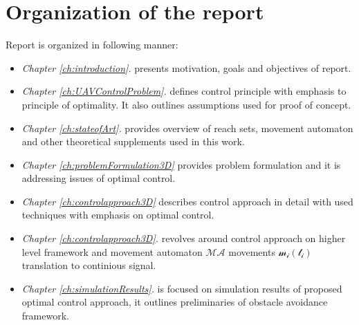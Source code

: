 \section{Organization of the report}\noindent
Report is organized in following manner:
\begin{itemize}
    \item\textit{Chapter \ref{ch:introduction}.} presents motivation, goals and objectives of report.
    \item\textit{Chapter \ref{ch:UAVControlProblem}.} defines control principle with emphasis to principle of optimality. It also outlines assumptions used for proof of concept.
    \item\textit{Chapter \ref{ch:stateofArt}.} provides overview of reach sets, movement automaton and other theoretical supplements used in this work.
    \item\textit{Chapter \ref{ch:problemFormulation3D}} provides problem formulation and it is addressing issues of optimal control.
    \item\textit{Chapter \ref{ch:controlapproach3D}} describes control approach in detail with used techniques with emphasis on optimal control.
    \item\textit{Chapter \ref{ch:controlapproach3D}.} revolves around control approach on higher level framework and movement automaton $\mathscr{MA}$ movements $\mathscr{m_i(t_i)}$ translation to continious signal.
    \item\textit{Chapter \ref{ch:simulationResults}.} is focused on simulation results of proposed optimal control approach, it outlines preliminaries of obstacle avoidance framework.
\end{itemize}


 





